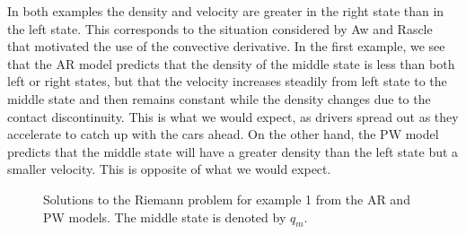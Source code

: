 \documentclass{article}
\begin{document}
\vspace{-4ex}
In both examples the density and velocity are greater in the right state than in the left state.  This corresponds to the situation considered by Aw and Rascle that motivated the use of the convective derivative.  In the first example, we see that the AR model predicts that the density of the middle state is less than both left or right states, but that the velocity increases steadily from left state to the middle state and then remains constant while the density changes due to the contact discontinuity.  This is what we would expect, as drivers spread out as they accelerate to catch up with the cars ahead.  On the other hand, the PW model predicts that the middle state will have a greater density than the left state but a smaller velocity.  This is opposite of what we would expect.

\begin{figure}[H]
 \centering
 \caption[Optional caption for list of figures]
 {Solutions to the Riemann problem for example 1 from the AR and PW models. The middle state is denoted by $q_m$.}
  \label{fig:example1}
\end{figure}
\end{document}
